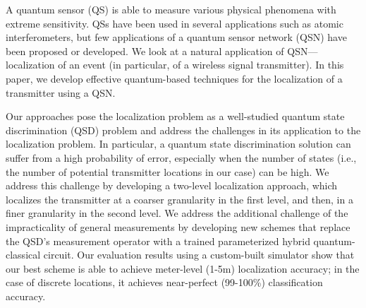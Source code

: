 A quantum sensor (QS) is able to measure various physical phenomena with extreme sensitivity.
QSs have been used in several applications such as atomic interferometers, but few applications of a quantum sensor network (QSN) have been proposed or developed.
We look at a natural application of QSN---localization of an event (in particular, of a wireless signal transmitter).
In this paper, we develop effective quantum-based techniques for the localization of a transmitter using a QSN.

Our approaches pose the localization problem as a well-studied quantum state discrimination (QSD) problem and address the challenges in its application to the localization problem. 
In particular, a quantum state discrimination solution can suffer from a high probability of 
error, especially when the number of states (i.e., the number of potential transmitter locations in our case) can be high. 
We address this challenge by developing a two-level localization approach, which localizes the transmitter at a coarser granularity in the first level, and then, in a finer granularity in the second level. 
We address the additional challenge of the impracticality of general measurements by 
developing new schemes that replace the QSD's measurement operator with a trained parameterized hybrid quantum-classical circuit.
Our evaluation results using a custom-built simulator show that our best scheme is able to 
achieve meter-level (1-5m) localization accuracy; 
in the case of discrete locations, 
it achieves near-perfect (99-100\%) classification accuracy. 